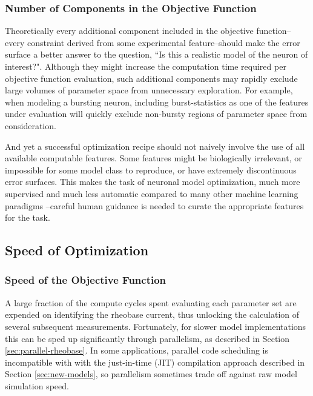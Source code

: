 \subsubsection{Number of Components in the Objective Function}
Theoretically every additional component included in the objective function--every constraint derived from some experimental feature--should make the error surface a better answer to the question, ``Is this a realistic model of the neuron of interest?".
Although they might increase the computation time required per objective function evaluation, such additional components may rapidly exclude large volumes of parameter space from unnecessary exploration.
For example, when modeling a bursting neuron, including burst-statistics as one of the features under evaluation will quickly exclude non-bursty regions of parameter space from consideration.

And yet a successful optimization recipe should not naively involve the use of all available computable features.
Some features might be biologically irrelevant, or impossible for some model class to reproduce, or have extremely discontinuous error surfaces. 
This makes the task of neuronal model optimization, much more supervised and much less automatic compared to many other machine learning paradigms --careful human guidance is needed to curate the appropriate features for the task. 

\subsection{Speed of Optimization}
\subsubsection{Speed of the Objective Function}
A large fraction of the compute cycles spent evaluating each parameter set are expended on identifying the rheobase current, thus unlocking the calculation of several subsequent measurements.
Fortunately, for slower model implementations this can be sped up significantly through parallelism, as described in Section \ref{sec:parallel-rheobase}.
In some applications, parallel code scheduling is incompatible with with the just-in-time (JIT) compilation approach described in Section \ref{sec:new-models}, so parallelism sometimes trade off against raw model simulation speed. 

